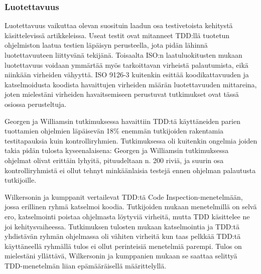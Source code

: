 \documentclass[finnish]{tktltiki2}
\theoremstyle{definition}
\theoremstyle{remark}
\begin{document}
\subsubsection{Luotettavuus}

Luotettavuus vaikuttaa olevan suosituin laadun osa testivetoista kehitystä käsittelevissä artikkeleissa. Useat testit ovat mitanneet TDD:llä tuotetun ohjelmiston laatua testien läpäisyn perusteella, jota pidän lähinnä luotettavuuteen liittyvänä tekijänä. Toisaalta ISO:n laatuluokitusten mukaan luotettavuus voidaan ymmärtää myös tarkoittavan virheistä palautumista, eikä niinkään virheiden vähyyttä. ISO 9126-3 kuitenkin esittää koodikattavuuden ja katselmoidusta koodista havaittujen virheiden määrän luotettavuuden mittareina, joten mielestäni virheiden havaitsemiseen perustuvat tutkimukset ovat tässä osiossa perusteltuja.

Georgen ja Williamsin \cite{George04} tutkimuksessa havaittiin TDD:tä käyttäneiden parien tuottamien ohjelmien läpäisevän 18\% enemmän tutkijoiden rakentamia testitapauksia kuin kontrolliryhmien. Tutkimuksessa oli kuitenkin ongelmia joiden takia pidän tulosta kyseenalaisena: Georgen ja Williamsin tutkimuksessa ohjelmat olivat erittäin lyhyitä, pituudeltaan n. 200 riviä, ja suurin osa kontrolliryhmistä ei ollut tehnyt minkäänlaisia testejä ennen ohjelman palautusta tutkijoille.

Wilkersonin ja kumppanit \cite{Wilkerson12} vertailevat TDD:tä Code Inspection-menetelmään, jossa erillinen ryhmä katselmoi koodia. Tutkijoiden mukaan menetelmillä on selvä ero, katselmointi poistaa ohjelmasta löytyviä virheitä, mutta TDD käsittelee ne joi kehitysvaiheessa. Tutkimuksen tulosten mukaan katselmointia ja TDD:tä yhdistävän ryhmän ohjelmassa oli vähiten virheitä kun taas pelkkää TDD:tä käyttäneellä ryhmällä tulos ei ollut perinteisiä menetelmiä parempi. Tulos on mielestäni yllättävä, Wilkersonin ja kumppanien mukaan se saattaa selittyä TDD-menetelmän liian epämääräisellä määrittelyllä.
\end{document}
